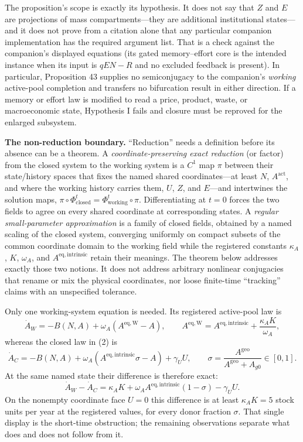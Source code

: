 \documentclass[11pt]{article}
\begin{document}
The proposition's scope is exactly its hypothesis. It does not say that \(Z\) and \(E\) are projections of mass compartments---they are additional institutional states---and it does not prove from a citation alone that any particular companion implementation has the required argument list. That is a check against the companion's displayed equations (its gated memory--effort core is the intended instance when its input is \(qEN-R\) and no excluded feedback is present). In particular, Proposition 43 supplies no semiconjugacy to the companion's \emph{working} active-pool completion and transfers no bifurcation result in either direction. If a memory or effort law is modified to read a price, product, waste, or macroeconomic state, Hypothesis I fails and closure must be reproved for the enlarged subsystem.

\textbf{The non-reduction boundary.} ``Reduction'' needs a definition before its absence can be a theorem. A \emph{coordinate-preserving exact reduction} (or factor) from the closed system to the working system is a \(C^1\) map \(\pi\) between their state/history spaces that fixes the named shared coordinates---at least \(N\), \(A^{\mathrm{act}}\), and where the working history carries them, \(U\), \(Z\), and \(E\)---and intertwines the solution maps, \(\pi\circ\Phi_{\mathrm{closed}}^t=\Phi_{\mathrm{working}}^t\circ\pi\). Differentiating at \(t=0\) forces the two fields to agree on every shared coordinate at corresponding states. A \emph{regular small-parameter approximation} is a family of closed fields, obtained by a named scaling of the closed system, converging uniformly on compact subsets of the common coordinate domain to the working field while the registered constants \(\kappa_A\), \(K\), \(\omega_A\), and \(A^{\mathrm{eq,intrinsic}}\) retain their meanings. The theorem below addresses exactly those two notions. It does not address arbitrary nonlinear conjugacies that rename or mix the physical coordinates, nor loose finite-time ``tracking'' claims with an unspecified tolerance.

Only one working-system equation is needed. Its registered active-pool law is
$$\dot A_W=-B(N,A)+\omega_A(A^{\mathrm{eq,W}}-A),\qquad A^{\mathrm{eq,W}}=A^{\mathrm{eq,intrinsic}}+\frac{\kappa_AK}{\omega_A},$$
whereas the closed law in (2) is
$$\dot A_C=-B(N,A)+\omega_A(A^{\mathrm{eq,intrinsic}}\sigma-A)+\gamma_UU,\qquad \sigma=\frac{A^{\mathrm{geo}}}{A^{\mathrm{geo}}+A_{g0}}\in[0,1].$$
At the same named state their difference is therefore exact:
$$\dot A_W-\dot A_C=\kappa_AK+\omega_AA^{\mathrm{eq,intrinsic}}(1-\sigma)-\gamma_UU.$$
On the nonempty coordinate face \(U=0\) this difference is at least \(\kappa_AK=5\) stock units per year at the registered values, for every donor fraction \(\sigma\). That single display is the short-time obstruction; the remaining observations separate what does and does not follow from it.
\end{document}
